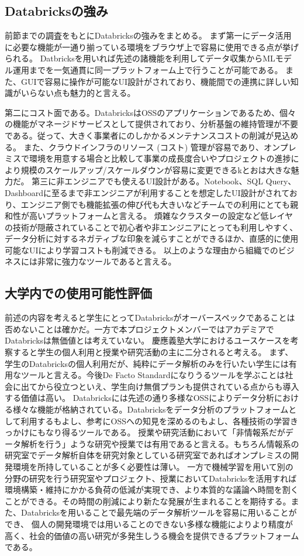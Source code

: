 \documentclass[twocolumn]{jsarticle}
\begin{document}
\subsection{Databricksの強み}
前節までの調査をもとにDatabricksの強みをまとめる。
まず第一にデータ活用に必要な機能が一通り揃っている環境をブラウザ上で容易に使用できる点が挙げられる。
Datbricksを用いれば先述の諸機能を利用してデータ収集からMLモデル運用までを一気通貫に同一プラットフォーム上で行うことが可能である。
また、GUIで容易に操作が可能なUI設計がされており、機能間での連携に詳しい知識がいらない点も魅力的と言える。\par
第二にコスト面である。DatabricksはOSSのアプリケーションであるため、個々の機能がマネージドサービスとして提供されており、分析基盤の維持管理が不要である。従って、大きく事業者にのしかかるメンテナンスコストの削減が見込める。
また、クラウドインフラのリソース (コスト) 管理が容易であり、オンプレミスで環境を用意する場合と比較して事業の成長度合いやプロジェクトの進捗により規模のスケールアップ/スケールダウンが容易に変更できるkとおは大きな魅力だ。
第三に非エンジニアでも使えるUI設計がある。Notebook、SQL Query、Dashboardに至るまで非エンジニアが利用することを想定したUI設計がされており、エンジニア側でも機能拡張の伸び代も大きいなどチームでの利用にとても親和性が高いプラットフォームと言える。
煩雑なクラスターの設定など低レイヤの技術が隠蔽されていることで初心者や非エンジニアにとっても利用しやすく、データ分析に対するネガティブな印象を減らすことができるほか、直感的に使用可能なUIにより学習コストも削減できる。
以上のような理由から組織でのビジネスには非常に強力なツールであると言える。
\subsection{大学内での使用可能性評価}
前述の内容を考えると学生にとってDatabricksがオーバースペックであることは否めないことは確かだ。一方で本プロジェクトメンバーではアカデミアでDatabricksは無価値とは考えていない。
慶應義塾大学におけるユースケースを考察すると学生の個人利用と授業や研究活動の主に二分されると考える。
まず、学生のDatabricksの個人利用だが、純粋にデータ解析のみを行いたい学生には有用なツールと言える。今後De Facto Standardになりうるツールを学ぶことは社会に出てから役立つといえ、学生向け無償プランも提供されている点からも導入する価値は高い。
Databricksには先述の通り多様なOSSによりデータ分析における様々な機能が格納されている。Databricksをデータ分析のプラットフォームとして利用するもよし、参考にOSSへの知見を深めるのもよし、各種技術の学習きっかけにもなり得るツールである。
授業や研究活動において「非情報系だがデータ解析を行う」ような研究や授業では有用であると言える。もちろん情報系の研究室でデータ解析自体を研究対象としている研究室であればオンプレミスの開発環境を所持していることが多く必要性は薄い。
一方で機械学習を用いて別の分野の研究を行う研究室やプロジェクト、授業においてDatabricksを活用すれば環境構築・維持にかかる負荷の低減が実現でき、より本質的な議論へ時間を割くことができる。その時間の削減により新たな発展が生まれることを期待する。また、Databricksを用いることで最先端のデータ解析ツールを容易に用いることができ、
個人の開発環境では用いることのできない多様な機能によりより精度が高く、社会的価値の高い研究が多発生しうる機会を提供できるプラットフォームである。\par
\end{document}
